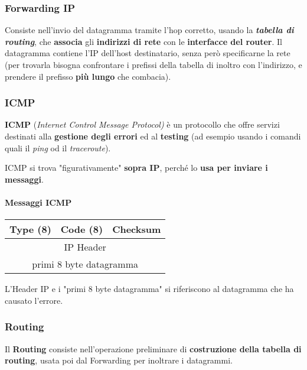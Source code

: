 \documentclass[a4paper]{article}
\begin{document}
		
		\subsubsection{Forwarding IP}
			
			Consiste nell'invio del datagramma tramite l'hop corretto, usando la \textbf{\emph{tabella di routing}}, che \textbf{associa} gli \textbf{indirizzi di rete} con le \textbf{interfacce del router}. Il datagramma contiene l'IP dell'host destinatario, senza però specificarne la rete (per trovarla bisogna confrontare i prefissi della tabella di inoltro con l'indirizzo, e prendere il prefisso \textbf{più lungo} che combacia).
			
			
		\subsubsection{ICMP}
		
			\textbf{ICMP} (\emph{Internet Control Message Protocol)} è un protocollo che offre servizi destinati alla \textbf{gestione degli errori} ed al \textbf{testing} (ad esempio usando i comandi quali il \emph{ping} od il \emph{traceroute}).
			
			ICMP si trova "figurativamente" \textbf{sopra IP}, perché lo \textbf{usa per inviare i messaggi}.
			
			\paragraph{Messaggi ICMP}
			\begin{center}
				\begin{tabular}{ccc}
					\textbf{Type} (8) & \textbf{Code} (8) & \textbf{Checksum} \\
					\hline
					\multicolumn{3}{c}{IP Header} \\
					\hline
					\multicolumn{3}{c}{primi 8 byte datagramma} \\
				\end{tabular}
			\end{center}
			
			L'Header IP e i "primi 8 byte datagramma" si riferiscono al datagramma che ha causato l'errore.
			
			\newpage
			
			
		\subsubsection{Routing}
		
			Il \textbf{Routing} consiste nell'operazione preliminare di \textbf{costruzione della tabella di routing}, usata poi dal Forwarding per inoltrare i datagrammi.
			
\end{document}
